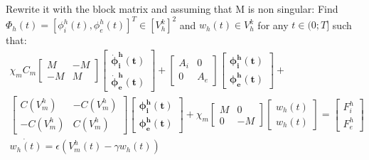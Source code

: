 \documentclass[a4paper,12pt]{article}
\begin{document}
 Rewrite it with the block matrix and assuming that M is non singular:\newline
 Find $\Phi_h(t)=[\phi_i^h(t),\phi_e^h(t)]^T \in [V_h^k]^2$ and $w_h(t) \in V_h^k$ for any $t \in (0;T]$ such that:
 \begin{equation}\label{block_matrix}
 \begin{gathered}
 \chi_mC_m \begin{bmatrix}M &-M \\ -M & M \end{bmatrix}
	\begin{bmatrix}\bm{\dot{\phi}_i^h(t)} \\ \bm{\dot{\phi}_e^h(t)} \end{bmatrix}
	 + \begin{bmatrix}A_i & 0 \\ 0 & A_e \end{bmatrix}
	 \begin{bmatrix}\bm{\phi_i^h(t)} \\ \bm{\phi_e^h(t)} \end{bmatrix} +\\
	   \begin{bmatrix}C(V_m^h) & -C(V_m^h) \\ -C(V_m^h) & C(V_m^h) \end{bmatrix} 
	   \begin{bmatrix} \bm{\phi_i^h(t)} \\ \bm{\phi_e^h(t)}  \end{bmatrix} 
	   +\chi_m \begin{bmatrix}M & 0 \\ 0 & -M \end{bmatrix} 
	   	\begin{bmatrix}w_h(t) \\ w_h(t) \end{bmatrix} = 
	   	\begin{bmatrix} F_i^h \\ F_e^h\end{bmatrix}\\
	   \dot{w_h(t)}=\epsilon (V_m^h(t)-\gamma w_h(t))
\end{gathered}
\end{equation}
\end{document}
